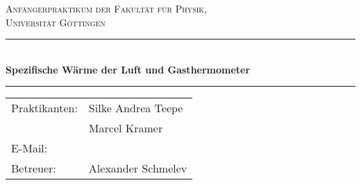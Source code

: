 \begin{titlepage}
\centering
\textsc{\Large Anfängerpraktikum der Fakultät für
  Physik,\\[1.5ex] Universität Göttingen}

\vspace*{4.2cm}

\rule{\textwidth}{1pt}\\[0.5cm]
{\huge \bfseries
  Spezifische Wärme der Luft und Gasthermometer}\\[0.5cm]
\rule{\textwidth}{1pt}

\vspace*{3.5cm}

\begin{Large}
\begin{tabular}{ll}
Praktikanten: &  Silke Andrea Teepe\\
& Marcel Kramer\\
E-Mail: & \\
Betreuer: & Alexander Schmelev\\
\end{tabular}
\end{Large}

\vspace*{0.8cm}

\begin{Large}
\end{Large}

\end{titlepage}